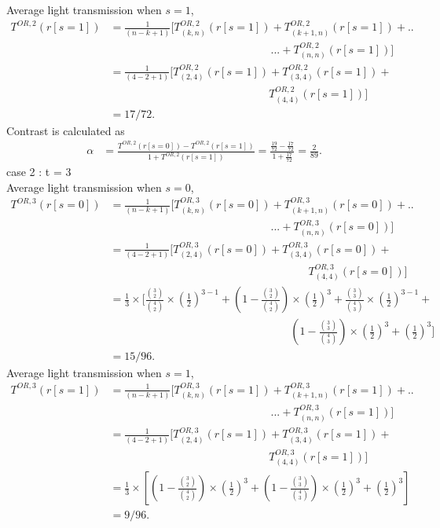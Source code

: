 Average light transmission when $s=1$, 
\begin{align*}
T^{OR,2}(r[s=1]) &= \frac{1}{(n-k+1)} [T^{OR,2}_{(k,n)} (r[s=1]) + T^{OR,2}_{(k+1,n)} (r[s=1]) + ..\\&\phantom{{}=\frac{1}{(n-k+1)} [T^{OR,2}_{(k,n)} (r[s=1])}... + T^{OR,2}_{(n,n)} (r[s=1])]\\
&= \frac{1}{(4-2+1)} [T^{OR,2}_{(2,4)} (r[s=1]) + T^{OR,2}_{(3,4)} (r[s=1]) + \\& \phantom{{}=\frac{1}{(4-2+1)} [T^{OR,2}_{(2,4)} (r[s=1])}T^{OR,2}_{(4,4)} (r[s=1])]\\
& = 17/72.
\end{align*}
Contrast is calculated as  
\begin{align*}
\alpha &= \frac{T^{OR,2}(r[s=0]) - T^{OR,2}(r[s=1])}{1 +T^{OR,2}(r[s=1])} = \frac{\frac{19}{72}-\frac{17}{72}}{1+\frac{17}{72}}
= \frac{2}{89}.
\end{align*}
case 2 : t = 3\\
Average light transmission when $s=0$,
\begin{align*}
T^{OR,3}(r[s=0]) &= \frac{1}{(n-k+1)} [T^{OR,3}_{(k,n)} (r[s=0]) + T^{OR,3}_{(k+1,n)} (r[s=0]) + ..\\&\phantom{{}=\frac{1}{(n-k+1)} [T^{OR,3}_{(k,n)} (r[s=0])}... + T^{OR,3}_{(n,n)} (r[s=0])]\\
&= \frac{1}{(4-2+1)} [T^{OR,3}_{(2,4)} (r[s=0]) + T^{OR,3}_{(3,4)} (r[s=0]) + \\&\phantom{{}= \frac{1}{(4-2+1)} [T^{OR,3}_{(2,4)} (r[s=0]) + T^{OR,3}}T^{OR,3}_{(4,4)} (r[s=0])]\\
&= \frac{1}{3} \times [ \frac {\binom 32}{\binom 42} \times (\frac{1}{2})^{3-1} +  (1-  \frac {\binom 32}{\binom 42})\times (\frac{1}{2})^{3} + \frac {\binom 33}{\binom 43} \times (\frac{1}{2})^{3-1} +\\&\phantom{{}= \frac{1}{3} \times [ \frac {\binom 32}{\binom 42} \times (\frac{1}{2})^{3-1}+(1-  \frac {\binom 32}{\binom 42})}  (1-  \frac {\binom 33}{\binom 43})\times (\frac{1}{2})^{3} + (\frac{1}{2})^{3}]\\
& = 15/96.
\end{align*}
Average light transmission when $s=1$,
\begin{align*}
T^{OR,3}(r[s=1]) &= \frac{1}{(n-k+1)} [T^{OR,3}_{(k,n)} (r[s=1]) + T^{OR,3}_{(k+1,n)} (r[s=1]) + ..\\&\phantom{{}=\frac{1}{(n-k+1)} [T^{OR,3}_{(k,n)} (r[s=1])}... + T^{OR,3}_{(n,n)} (r[s=1])]\\
&= \frac{1}{(4-2+1)} [T^{OR,3}_{(2,4)} (r[s=1]) + T^{OR,3}_{(3,4)} (r[s=1]) + \\&\phantom{{}=\frac{1}{(4-2+1)} [T^{OR,3}_{(2,4)} (r[s=1])}T^{OR,3}_{(4,4)} (r[s=1])]\\
&= \frac{1}{3} \times [(1-  \frac {\binom 32}{\binom 42})\times (\frac{1}{2})^{3} + (1-  \frac {\binom 33}{\binom 43})\times (\frac{1}{2})^{3} + (\frac{1}{2})^{3}]\\
& = 9/96.
\end{align*}
